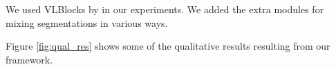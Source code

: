 \documentclass[twoside,11pt]{article}
\begin{document}
We used VLBlocks by \cite{fulkerson09class} in our experiments. We added the
extra modules for mixing segmentations in various ways.

Figure \ref{fig:qual_res} shows some of the qualitative results resulting from
our framework.

\begin{figure}[!t]
\centering
{}
\\
\end{figure}
\end{document}
